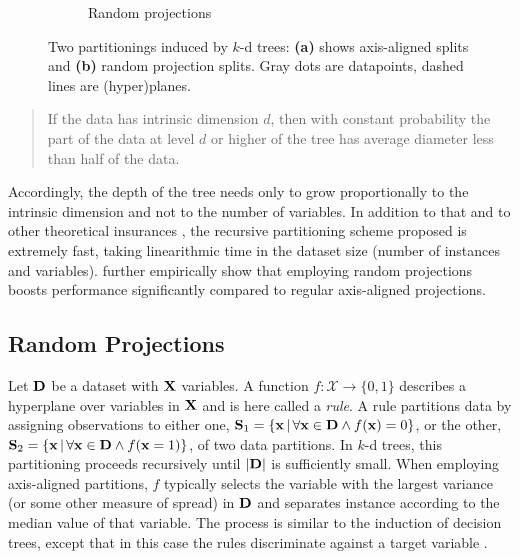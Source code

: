 \begin{figure}[t]
\begin{subfigure}[t]{0.495\textwidth}
    \caption{Random projections}
  \end{subfigure}
  \caption{Two partitionings induced by $k$-d trees: \textbf{(a)} shows axis-aligned splits and
    \textbf{(b)} random projection splits. Gray dots are datapoints, dashed lines are (hyper)planes.}
    \label{fig:projections}
\end{figure}

\begin{quote}
  If the data has intrinsic dimension $d$, then with constant probability the part of the data at
  level $d$ or higher of the tree has average diameter less than half of the data.
\end{quote}

Accordingly, the depth of the tree needs only to grow proportionally to the intrinsic dimension and
not to the number of variables. In addition to that and to other theoretical insurances
\citep{dhesi10}, the recursive partitioning scheme proposed is extremely fast, taking linearithmic
time in the dataset size (number of instances and variables). \citet{dasgupta08a} further
empirically show that employing random projections boosts performance significantly compared to
regular axis-aligned projections.

\subsection{Random Projections}
\label{sec:rp}

Let $\mathbf{D}$ be a dataset with $\mathbf{X}$ variables. A function $f:\mathcal{X}\to\{0,1\}$ describes a
hyperplane over variables in $\mathbf{X}$ and is here called a \emph{rule}. A rule partitions data by
assigning observations to either one, $\mathbf{S}_1=\{\mathbf{x}\,|\,\forall\mathbf{x}\in\mathbf{D}\wedge
f(\mathbf{x})=0\}$, or the other, $\mathbf{S}_2=\{\mathbf{x}\,|\,\forall\mathbf{x}\in\mathbf{D}\wedge
f(\mathbf{x}=1)\}$, of two data partitions. In $k$-d trees, this partitioning proceeds recursively
until $|\mathbf{D}|$ is sufficiently small. When employing axis-aligned partitions, $f$ typically
selects the variable with the largest variance (or some other measure of spread) in $\mathbf{D}$ and
separates instance according to the median value of that variable. The process is similar to the
induction of decision trees, except that in this case the rules discriminate against a target
variable \citep{breiman01}.

